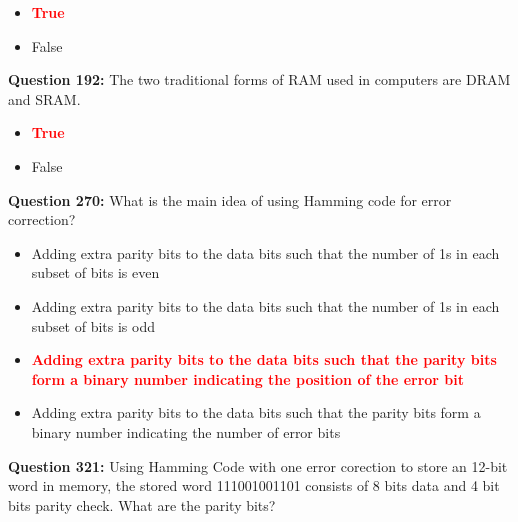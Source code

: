 \documentclass[12pt,a4paper]{article}
\begin{document}
\begin{itemize}
    \item[\textbf{A.}] \textcolor{red}{\textbf{True}}
    \item[\textbf{B.}] False
\end{itemize}

\vspace{0.5cm}

\vspace{0.5cm}

\textbf{Question 192:} The two traditional forms of RAM used in computers are DRAM and SRAM.

\begin{itemize}
    \item[\textbf{A.}] \textcolor{red}{\textbf{True}}
    \item[\textbf{B.}] False
\end{itemize}

\vspace{0.5cm}

\vspace{0.5cm}

\textbf{Question 270:} What is the main idea of using Hamming code for error correction?

\begin{itemize}
    \item[\textbf{A.}] Adding extra parity bits to the data bits such that the number of 1s in each subset of bits is even
    \item[\textbf{B.}] Adding extra parity bits to the data bits such that the number of 1s in each subset of bits is odd
    \item[\textbf{C.}] \textcolor{red}{\textbf{Adding extra parity bits to the data bits such that the parity bits form a binary number indicating the position of the error bit}}
    \item[\textbf{D.}] Adding extra parity bits to the data bits such that the parity bits form a binary number indicating the number of error bits
\end{itemize}

\vspace{0.5cm}

\vspace{0.5cm}

\textbf{Question 321:} Using Hamming Code with one error corection to store an 12-bit word in memory, the stored word 111001001101 consists of 8 bits data and 4 bit bits parity check. What are the parity bits?
\end{document}
